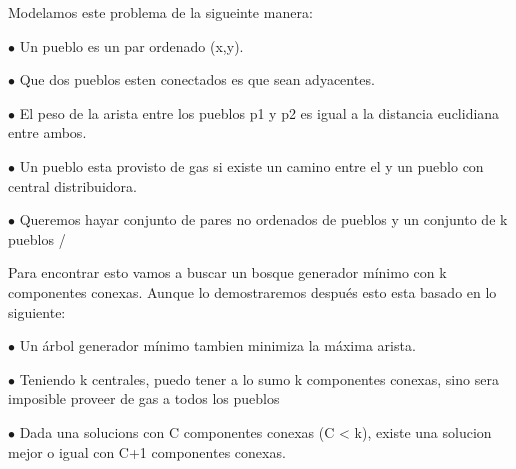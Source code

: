 Modelamos este problema de la sigueinte manera:

$\bullet$ Un pueblo es un par ordenado (x,y).

$\bullet$ Que dos pueblos esten conectados es que sean adyacentes.

$\bullet$ El peso de la arista entre los pueblos p1 y p2 es igual a la distancia euclidiana entre ambos.

$\bullet$ Un pueblo esta provisto de gas si existe un camino entre el y un pueblo con central distribuidora.

$\bullet$ Queremos hayar conjunto de pares no ordenados de pueblos y un conjunto de k pueblos / %


Para encontrar esto vamos a buscar un bosque generador mínimo con k componentes conexas.
Aunque lo demostraremos después esto esta basado en lo siguiente:

$\bullet$ Un árbol generador mínimo tambien minimiza la máxima arista.

$\bullet$ Teniendo k centrales, puedo tener a lo sumo k componentes conexas, sino sera imposible proveer de gas a todos los pueblos

$\bullet$ Dada una solucions con C componentes conexas (C < k), existe una solucion mejor o igual con C+1 componentes conexas.

